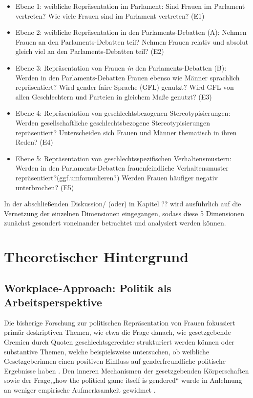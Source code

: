 \documentclass[12pt, 
    twoside=false, 
    bibliography=totoc, 
    numbers=endperiod, 
    headings=normal, 
    toc=chapterentrydotfill
    ]{scrbook}
\begin{document}
\begin{itemize}
    \item Ebene 1: weibliche Repräsentation im Parlament: Sind Frauen im Parlament vertreten? Wie viele Frauen sind im Parlament vertreten? (E1)
    \item Ebene 2: weibliche Repräsentation in den Parlaments-Debatten (A): Nehmen Frauen an den Parlaments-Debatten teil? Nehmen Frauen relativ und absolut gleich viel an den Parlaments-Debatten teil? (E2)
    \item Ebene 3: Repräsentation von Frauen \emph{in} den Parlaments-Debatten (B): Werden in den Parlaments-Debatten Frauen ebenso wie Männer sprachlich repräsentiert? Wird gender-faire-Sprache (GFL) genutzt? Wird GFL von allen Geschlechtern und Parteien in gleichem Maße genutzt? (E3)
    \item Ebene 4: Repräsentation von geschlechtsbezogenen Stereotypisierungen: Werden gesellschaftliche geschlechtsbezogene Stereotypisierungen repräsentiert? Unterscheiden sich Frauen und Männer thematisch in ihren Reden? (E4)
    \item Ebene 5: Repräsentation von geschlechtsspezifischen Verhaltensmustern: Werden in den Parlaments-Debatten frauenfeindliche Verhaltensmuster repräsentiert?(ggf.umformulieren?) Werden Frauen häufiger negativ unterbrochen? (E5)
\end{itemize}

In der abschließenden Diskussion/ (oder) in Kapitel ?? wird ausführlich auf die Vernetzung der einzelnen Dimensionen eingegangen, sodass diese 5 Dimensionen zunächst gesondert voneinander betrachtet und analysiert werden können.


\chapter{Theoretischer Hintergrund}

\section{Workplace-Approach: Politik als Arbeitsperspektive} 

Die bisherige Forschung zur politischen Repräsentation von Frauen fokussiert primär deskriptiven Themen, wie etwa die Frage danach, wie gesetzgebende Gremien durch Quoten geschlechtsgerechter strukturiert werden können \parencites [vgl.]{dahlerup*_2005}{schwindt-bayer_2009} oder substantive Themen, welche beispielsweise untersuchen, ob weibliche Gesetzgeberinnen einen positiven Einfluss auf genderfreundliche politische Ergebnisse haben \parencites [199]{erikson_2018}{beckwith_2007}. Den inneren Mechanismen der gesetzgebenden Körperschaften sowie der Frage,„how the political game itself is gendered“ wurde in Anlehnung an \textcite{erikson_2018} weniger empirische Aufmerksamkeit gewidmet \parencites[199]{erikson_2018}[vgl.][]{childs_2016}{dahlerup_2013}{wangnerud_2015}.
\end{document}
